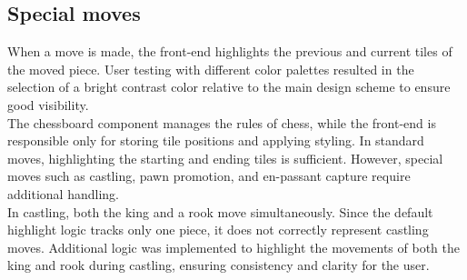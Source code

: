 \subsection{Special moves}
When a move is made, the front-end highlights the previous and current tiles of the moved piece. User testing with different color palettes resulted in the selection of a bright contrast color relative to the main design scheme to ensure good visibility. \\

The chessboard component manages the rules of chess, while the front-end is responsible only for storing tile positions and applying styling. In standard moves, highlighting the starting and ending tiles is sufficient. However, special moves such as \gls{castling}, pawn \gls{promotion}, and \gls{en-passant} capture require additional handling. \\

In \gls{castling}, both the king and a rook move simultaneously. Since the default highlight logic tracks only one piece, it does not correctly represent \gls{castling} moves. Additional logic was implemented to highlight the movements of both the king and rook during \gls{castling}, ensuring consistency and clarity for the user.


















